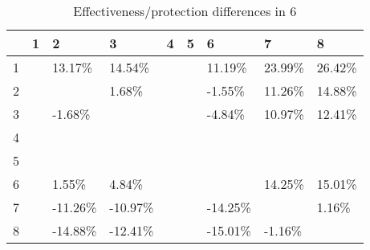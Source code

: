 \begin{table}[ht]
\centering
\begin{tabular}{rllllllll}
  \hline
 & 1 & 2 & 3 & 4 & 5 & 6 & 7 & 8 \\ 
  \hline
1 &  & 13.17\% & 14.54\% &  &  & 11.19\% & 23.99\% & 26.42\% \\ 
  2 &  &  & 1.68\% &  &  & -1.55\% & 11.26\% & 14.88\% \\ 
  3 &  & -1.68\% &  &  &  & -4.84\% & 10.97\% & 12.41\% \\ 
  4 &  &  &  &  &  &  &  &  \\ 
  5 &  &  &  &  &  &  &  &  \\ 
  6 &  & 1.55\% & 4.84\% &  &  &  & 14.25\% & 15.01\% \\ 
  7 &  & -11.26\% & -10.97\% &  &  & -14.25\% &  & 1.16\% \\ 
  8 &  & -14.88\% & -12.41\% &  &  & -15.01\% & -1.16\% &  \\ 
   \hline
\end{tabular}
\caption{Effectiveness/protection differences in  6} 
\end{table}
